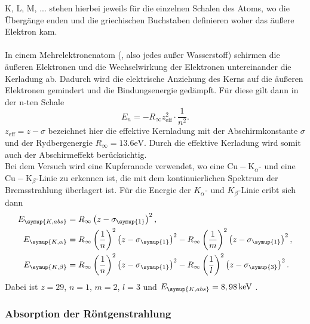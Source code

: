 K, L, M, ... stehen hierbei jeweils für die einzelnen Schalen des Atoms, wo die Übergänge
enden und die griechischen Buchstaben definieren woher das äußere Elektron kam.\\
\\
In einem Mehrelektronenatom (, also jedes außer Wasserstoff) schirmen die äußeren
Elektronen und die Wechselwirkung der Elektronen untereinander die Kerladung ab. Dadurch
wird die elektrische Anziehung des Kerns auf die äußeren Elektronen gemindert und die Bindungsenergie
gedämpft. Für diese gilt dann in der n-ten Schale
\begin{equation}
    \label{eqn:Bindungsenergie}
    E_n = -R_{\infty} z_{\mathrm{eff}}^2 \cdot \frac{1}{n^2}.
\end{equation}
$z_{\mathrm{eff}} = z - \sigma$ bezeichnet hier die effektive Kernladung mit der 
Abschirmkonstante $\sigma$ und der Rydbergenergie $R_{\infty} = 13.6 \si{\electronvolt}$.
Durch die effektive Kerladung wird somit auch der Abschirmeffekt berücksichtig.\\
Bei dem Versuch wird eine Kupferanode verwendet, wo eine $\mathrm{Cu-K}_\alpha$- und eine
$\mathrm{Cu-K}_\beta$-Linie zu erkennen ist, die mit dem kontinuierlichen Spektrum der
Bremsstrahlung überlagert ist. Für die Energie der $K_{\alpha}$- und $K_{\beta}$-Linie eribt sich dann
\begin{align}
    \label{eqn:Ekabs}
    E_{\symup{K, abs}} &= R_{\infty}\left(z - \sigma_{\symup{1}}\right)^2 ,\\
    \label{eqn:EKa}
    E_{\symup{K, \alpha}} &= R_{\infty}\left(\frac{1}{n}\right)^2 \left(z-\sigma_{\symup{1}}\right)^2 -R_{\infty}\left(\frac{1}{m}\right)^2 \left(z-\sigma_{\symup{1}}\right)^2 ,\\
    \label{eqn:EKb}
    E_{\symup{K, \beta}} &= R_{\infty}\left(\frac{1}{n}\right)^2 \left(z-\sigma_{\symup{1}}\right)^2 -R_{\infty}\left(\frac{1}{l}\right)^2 \left(z-\sigma_{\symup{3}}\right)^2 .
\end{align}
Dabei ist $z = 29$, $n=1$, $m=2$, $l=3$ und $E_{\symup{K, abs}} = 8,98\,\unit{\kilo\electronvolt}$ \cite{ekabs}.

\subsubsection{Absorption der Röntgenstrahlung}

